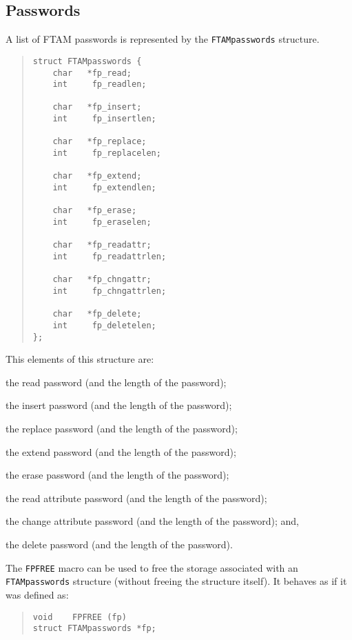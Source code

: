 \subsection	{Passwords}
A list of FTAM passwords is represented by the \verb"FTAMpasswords" structure.
\begin{quote}\small\begin{verbatim}
struct FTAMpasswords {
    char   *fp_read;
    int     fp_readlen;

    char   *fp_insert;
    int     fp_insertlen;

    char   *fp_replace;
    int     fp_replacelen;

    char   *fp_extend;
    int     fp_extendlen;

    char   *fp_erase;
    int     fp_eraselen;

    char   *fp_readattr;
    int     fp_readattrlen;

    char   *fp_chngattr;
    int     fp_chngattrlen;

    char   *fp_delete;
    int     fp_deletelen;
};
\end{verbatim}\end{quote}
This elements of this structure are:
\begin{describe}
\item[\verb"fp\_read"/\verb"fp\_readlen":] the read password
(and the length of the password);

\item[\verb"fp\_insert"/\verb"fp\_insertlen":] the insert password
(and the length of the password);

\item[\verb"fp\_replace"/\verb"fp\_replacelen":] the replace password
(and the length of the password);

\item[\verb"fp\_extend"/\verb"fp\_extendlen":] the extend password
(and the length of the password);

\item[\verb"fp\_erase"/\verb"fp\_eraselen":] the erase password
(and the length of the password);

\item[\verb"fp\_readattr"/\verb"fp\_readattrlen":] the read attribute password
(and the length of the password);

\item[\verb"fp\_chngattr"/\verb"fp\_chngattrlen":] the change attribute
password (and the length of the password);
and,

\item[\verb"fp\_delete"/\verb"fp\_deletelen":] the delete password
(and the length of the password).
\end{describe}
The \verb"FPFREE" macro can be used to free the storage associated with an
\verb"FTAMpasswords" structure (without freeing the structure itself).
It behaves as if it was defined as:
\begin{quote}\small\begin{verbatim}
void    FPFREE (fp)
struct FTAMpasswords *fp;
\end{verbatim}\end{quote}

